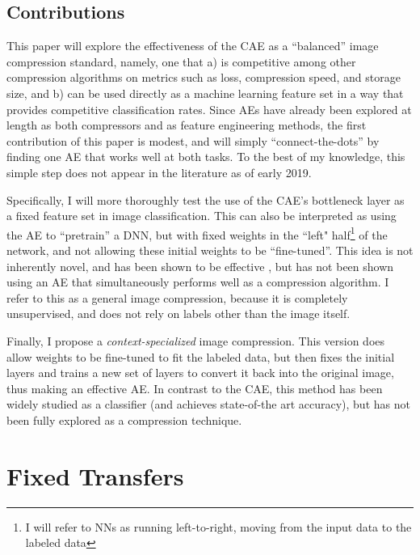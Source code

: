 \documentclass[twoside,11pt]{article}
\begin{document}
\subsection{Contributions}

This paper will explore the effectiveness of the CAE as a “balanced” image compression standard, namely, one that a) is competitive among other compression algorithms on metrics such as loss, compression speed, and storage size, and b) can be used directly as a machine learning feature set in a way 
that provides competitive classification rates. Since AEs have already been explored at length as both compressors and as feature engineering methods, the first contribution of this paper is modest, and will simply “connect-the-dots” by finding one AE that works well at both tasks. 
To the best of my knowledge, this simple step does not appear in the literature as of early 2019.

Specifically, I will more thoroughly test the use of the CAE’s bottleneck layer as a fixed feature set in image classification. This can also be interpreted as using the AE to “pretrain” a DNN, but with fixed weights in the ``left" half\footnote{I will refer to NNs as running left-to-right, moving from the input data to the labeled data} of the network, and not allowing these initial weights to be “fine-tuned”. 
This idea is not inherently novel, and has been shown to be effective \citep{bengio2006pretrain}, but has not been shown using an AE that simultaneously performs well as a compression algorithm. I refer to this as a general image compression, because it is completely unsupervised, and does not rely on labels other than the image itself.

Finally, I propose a \emph{context-specialized} image compression. This version does allow weights to be fine-tuned to fit the labeled data, but then fixes the initial layers and trains a new set of layers to convert it back into the original image, thus making an effective AE. In contrast to the CAE, this method has been widely studied as a classifier (and achieves state-of-the art accuracy), but has not been fully explored as a compression technique.








\section{Fixed Transfers} \label{fixed}
\end{document}
